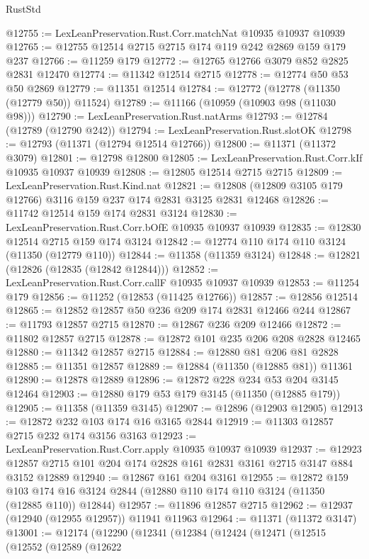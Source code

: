 \begin{lexlean}{RustStd}
\begin{coremodule}
@12755 := LexLeanPreservation.Rust.Corr.matchNat @10935 @10937 @10939
@12765 := @12755 @12514 @2715 @2715 @174 @119 @242 @2869 @159 @179 @237
@12766 := @11259 @179
@12772 := @12765 @12766 @3079 @852 @2825 @2831 @12470
@12774 := @11342 @12514 @2715
@12778 := @12774 @50 @53 @50 @2869
@12779 := @11351 @12514
@12784 := @12772 (@12778 (@11350 (@12779 @50)) @11524)
@12789 := @11166 (@10959 (@10903 @98 (@11030 @98)))
@12790 := LexLeanPreservation.Rust.natArms
@12793 := @12784 (@12789 (@12790 @242))
@12794 := LexLeanPreservation.Rust.slotOK
@12798 := @12793 (@11371 (@12794 @12514 @12766))
@12800 := @11371 (@11372 @3079)
@12801 := @12798 @12800
@12805 := LexLeanPreservation.Rust.Corr.kIf @10935 @10937 @10939
@12808 := @12805 @12514 @2715 @2715
@12809 := LexLeanPreservation.Rust.Kind.nat
@12821 := @12808 (@12809 @3105 @179 @12766) @3116 @159 @237 @174 @2831 @3125 @2831 @12468
@12826 := @11742 @12514 @159 @174 @2831 @3124
@12830 := LexLeanPreservation.Rust.Corr.bOfE @10935 @10937 @10939
@12835 := @12830 @12514 @2715 @159 @174 @3124
@12842 := @12774 @110 @174 @110 @3124 (@11350 (@12779 @110))
@12844 := @11358 (@11359 @3124)
@12848 := @12821 (@12826 (@12835 (@12842 @12844)))
@12852 := LexLeanPreservation.Rust.Corr.callF @10935 @10937 @10939
@12853 := @11254 @179
@12856 := @11252 (@12853 (@11425 @12766))
@12857 := @12856 @12514
@12865 := @12852 @12857 @50 @236 @209 @174 @2831 @12466 @244
@12867 := @11793 @12857 @2715
@12870 := @12867 @236 @209 @12466
@12872 := @11802 @12857 @2715
@12878 := @12872 @101 @235 @206 @208 @2828 @12465
@12880 := @11342 @12857 @2715
@12884 := @12880 @81 @206 @81 @2828
@12885 := @11351 @12857
@12889 := @12884 (@11350 (@12885 @81)) @11361
@12890 := @12878 @12889
@12896 := @12872 @228 @234 @53 @204 @3145 @12464
@12903 := @12880 @179 @53 @179 @3145 (@11350 (@12885 @179))
@12905 := @11358 (@11359 @3145)
@12907 := @12896 (@12903 @12905)
@12913 := @12872 @232 @103 @174 @16 @3165 @2844
@12919 := @11303 @12857 @2715 @232 @174 @3156 @3163
@12923 := LexLeanPreservation.Rust.Corr.apply @10935 @10937 @10939
@12937 := @12923 @12857 @2715 @101 @204 @174 @2828 @161 @2831 @3161 @2715 @3147 @884 @3152 @12889
@12940 := @12867 @161 @204 @3161
@12955 := @12872
    @159
    @103
    @174
    @16
    @3124
    @2844
    (@12880 @110 @174 @110 @3124 (@11350 (@12885 @110)) @12844)
@12957 := @11896 @12857 @2715
@12962 := @12937 (@12940 (@12955 @12957)) @11941 @11963
@12964 := @11371 (@11372 @3147)
@13001 := @12174
    (@12290
      (@12341
        (@12384
          (@12424
            (@12471
              (@12515
                (@12552
                  (@12589
                    (@12622

\end{coremodule}
\end{lexlean}

